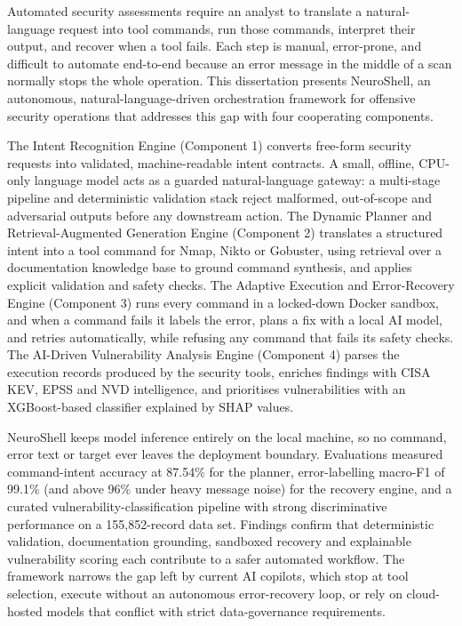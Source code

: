 Automated security assessments require an analyst to translate a natural-language
request into tool commands, run those commands, interpret their output, and
recover when a tool fails. Each step is manual, error-prone, and difficult to
automate end-to-end because an error message in the middle of a scan normally
stops the whole operation. This dissertation presents NeuroShell, an autonomous,
natural-language-driven orchestration framework for offensive security
operations that addresses this gap with four cooperating components.

The Intent Recognition Engine (Component 1) converts free-form security requests
into validated, machine-readable intent contracts. A small, offline, CPU-only
language model acts as a guarded natural-language gateway: a multi-stage
pipeline and deterministic validation stack reject malformed, out-of-scope and
adversarial outputs before any downstream action. The Dynamic Planner and
Retrieval-Augmented Generation Engine (Component 2) translates a structured
intent into a tool command for Nmap, Nikto or Gobuster, using retrieval over a
documentation knowledge base to ground command synthesis, and applies explicit
validation and safety checks. The Adaptive Execution and Error-Recovery Engine
(Component 3) runs every command in a locked-down Docker sandbox, and when a
command fails it labels the error, plans a fix with a local AI model, and retries
automatically, while refusing any command that fails its safety checks. The
AI-Driven Vulnerability Analysis Engine (Component 4) parses the execution
records produced by the security tools, enriches findings with CISA KEV, EPSS
and NVD intelligence, and prioritises vulnerabilities with an XGBoost-based
classifier explained by SHAP values.

NeuroShell keeps model inference entirely on the local machine, so no command,
error text or target ever leaves the deployment boundary. Evaluations measured
command-intent accuracy at 87.54\% for the planner, error-labelling macro-F1 of
99.1\% (and above 96\% under heavy message noise) for the recovery engine, and a
curated vulnerability-classification pipeline with strong discriminative
performance on a 155,852-record data set. Findings confirm that deterministic
validation, documentation grounding, sandboxed recovery and explainable
vulnerability scoring each contribute to a safer automated workflow. The
framework narrows the gap left by current AI copilots, which stop at tool
selection, execute without an autonomous error-recovery loop, or rely on
cloud-hosted models that conflict with strict data-governance requirements.

